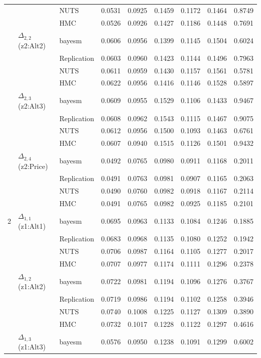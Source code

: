 \begin{longtable}{cllcccccc}
 &  & NUTS & 0.0531 & 0.0925 & 0.1459 & 0.1172 & 0.1464 & 0.8749 \\
 &  & HMC & 0.0526 & 0.0926 & 0.1427 & 0.1186 & 0.1448 & 0.7691 \\
 & $\Delta_{2,2}$ (z2:Alt2) & bayesm & 0.0606 & 0.0956 & 0.1399 & 0.1145 & 0.1504 & 0.6024 \\
 &  & Replication & 0.0603 & 0.0960 & 0.1423 & 0.1144 & 0.1496 & 0.7963 \\
 &  & NUTS & 0.0611 & 0.0959 & 0.1430 & 0.1157 & 0.1561 & 0.5781 \\
 &  & HMC & 0.0622 & 0.0956 & 0.1416 & 0.1146 & 0.1528 & 0.5897 \\
 & $\Delta_{2,3}$ (z2:Alt3) & bayesm & 0.0609 & 0.0955 & 0.1529 & 0.1106 & 0.1433 & 0.9467 \\
 &  & Replication & 0.0608 & 0.0962 & 0.1543 & 0.1115 & 0.1467 & 0.9075 \\
 &  & NUTS & 0.0612 & 0.0956 & 0.1500 & 0.1093 & 0.1463 & 0.6761 \\
 &  & HMC & 0.0607 & 0.0940 & 0.1515 & 0.1126 & 0.1501 & 0.9432 \\
 & $\Delta_{2,4}$ (z2:Price) & bayesm & 0.0492 & 0.0765 & 0.0980 & 0.0911 & 0.1168 & 0.2011 \\
 &  & Replication & 0.0491 & 0.0763 & 0.0981 & 0.0907 & 0.1165 & 0.2063 \\
 &  & NUTS & 0.0490 & 0.0760 & 0.0982 & 0.0918 & 0.1167 & 0.2114 \\
 &  & HMC & 0.0491 & 0.0765 & 0.0982 & 0.0925 & 0.1185 & 0.2101 \\
2 & $\Delta_{1,1}$ (z1:Alt1) & bayesm & 0.0695 & 0.0963 & 0.1133 & 0.1084 & 0.1246 & 0.1885 \\
 &  & Replication & 0.0683 & 0.0968 & 0.1135 & 0.1080 & 0.1252 & 0.1942 \\
 &  & NUTS & 0.0706 & 0.0987 & 0.1164 & 0.1105 & 0.1277 & 0.2017 \\
 &  & HMC & 0.0707 & 0.0977 & 0.1174 & 0.1111 & 0.1296 & 0.2378 \\
 & $\Delta_{1,2}$ (z1:Alt2) & bayesm & 0.0722 & 0.0981 & 0.1194 & 0.1096 & 0.1276 & 0.3767 \\
 &  & Replication & 0.0719 & 0.0986 & 0.1194 & 0.1102 & 0.1258 & 0.3946 \\
 &  & NUTS & 0.0740 & 0.1008 & 0.1225 & 0.1127 & 0.1309 & 0.3890 \\
 &  & HMC & 0.0732 & 0.1017 & 0.1228 & 0.1122 & 0.1297 & 0.4616 \\
 & $\Delta_{1,3}$ (z1:Alt3) & bayesm & 0.0576 & 0.0950 & 0.1238 & 0.1091 & 0.1299 & 0.6002 \\

\end{longtable}
